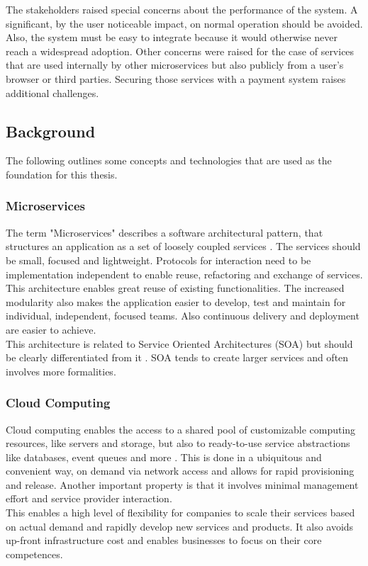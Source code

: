 \documentclass[a4paper,12pt]{scrartcl}
\begin{document}
The stakeholders raised special concerns about the performance of the system. A significant, by the user noticeable impact, on normal operation should be avoided. Also, the system must be easy to integrate because it would otherwise never reach a widespread adoption. Other concerns were raised for the case of services that are used internally by other microservices but also publicly from a user's browser or third parties. Securing those services with a payment system raises additional challenges.


\subsection{Background}

The following outlines some concepts and technologies that are used as the foundation for this thesis.

\subsubsection{Microservices}

The term "Microservices" describes a software architectural pattern, that structures an application as a set of loosely coupled services \cite{web2}. The services should be small, focused and lightweight. Protocols for interaction need to be implementation independent to enable reuse, refactoring and exchange of services. This architecture enables great reuse of existing functionalities. The increased modularity also makes the application easier to develop, test and maintain for individual, independent, focused teams. Also continuous delivery and deployment are easier to achieve.\\
This architecture is related to Service Oriented Architectures (SOA) \cite{kart2009managing} but should be clearly differentiated from it \cite{Birk2016}. SOA tends to create larger services and often involves more formalities.

\subsubsection{Cloud Computing}

Cloud computing enables the access to a shared pool of customizable computing resources, like servers and storage, but also to ready-to-use service abstractions like databases, event queues and more \cite{web40}. This is done in a ubiquitous and convenient way, on demand via network access and allows for rapid provisioning and release. Another important property is that it involves minimal management effort and service provider interaction.\\
This enables a high level of flexibility for companies to scale their services based on actual demand and rapidly develop new services and products. It also avoids up-front infrastructure cost and enables businesses to focus on their core competences.
\end{document}
